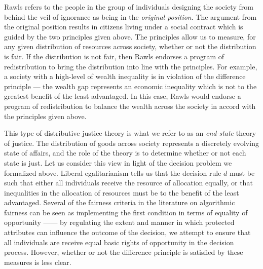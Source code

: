 Rawls refers to the people in the group of individuals designing the society
from behind the veil of ignorance as being in the \textit{original position}.
The argument from the original position results in citizens living under a
social contract which is guided by the two principles given above. The
principles allow us to measure, for any given distribution of resources across
society, whether or not the distribution is fair. If the distribution is not
fair, then Rawls endorses a program of redistribution to bring the distribution
into line with the principles. For example, a society with a high-level of
wealth inequality is in violation of the difference principle — the wealth gap
represents an economic inequality which is not to the greatest benefit of the
least advantaged. In this case, Rawls would endorse a program of redistribution
to balance the wealth across the society in accord with the principles given
above.

This type of distributive justice theory is what we refer to as an
\textit{end-state} theory of justice. The distribution of goods across society
represents a discretely evolving state of affairs, and the role of the theory is
to determine whether or not each state is just. Let us consider this view in
light of the decision problem we formalized above. Liberal egalitarianism tells
us that the decision rule $d$ must be such that either all individuals receive
the resource of allocation equally, or that inequalities in the allocation of
resources must be to the benefit of the least advantaged. Several of the
fairness criteria in the literature on algorithmic fairness can be seen as
implementing the first condition in terms of equality of opportunity —— by 
regulating the extent and manner in which protected attributes can influence the
outcome of the decision, we attempt to ensure that all individuals are receive
equal basic rights of opportunity in the decision process. However, whether
or not the difference principle is satisfied by these measures is less clear.

